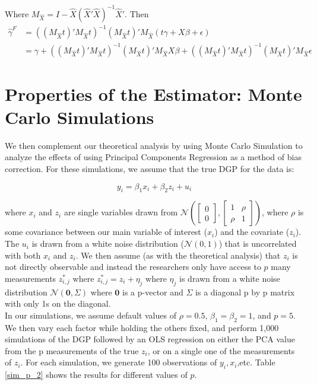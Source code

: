 \documentclass[12pt]{article}
\def\g{\gamma}
\begin{document}
Where $M_{\hat{X}}=I-\hat{X}(\hat{X}'\hat{X})^{-1}\hat{X}'$. Then
\begin{align}
     \hat{\g}^F & = ((M_{\hat{X}}t)'M_{\hat{X}}t)^{-1}(M_{\hat{X}}t)'M_{\hat{X}}(t\gamma  + X\beta + \epsilon) \\
     &=\gamma +((M_{\hat{X}}t)'M_{\hat{X}}t)^{-1}(M_{\hat{X}}t)'M_{\hat{X}}X\beta+((M_{\hat{X}}t)'M_{\hat{X}}t)^{-1}(M_{\hat{X}}t)'M_{\hat{X}}\epsilon
\end{align}

    \section*{Properties of the Estimator: Monte Carlo Simulations}

        We then complement our theoretical analysis by using Monte Carlo Simulation to analyze the effects of using Principal Components Regression as a method of bias correction. For these simulations, we assume that the true DGP for the data is:

        $$y_i = \beta_1 x_i + \beta_2 z_i + u_i$$

        where $x_i$ and $z_i$ are single variables drawn from $\mathcal{N}(\begin{bmatrix} 0\\ 0 \end{bmatrix}, \begin{bmatrix} 1 & \rho\\ \rho & 1\end{bmatrix})$, where $\rho$ is some covariance between our main variable of interest ($x_i$) and the covariate ($z_i$). The $u_i$ is drawn from a white noise distribution ($\mathcal{N}(0,1)$) that is uncorrelated with both $x_i$ and $z_i$. We then assume (as with the theoretical analysis) that $z_i$ is not directly observable and instead the researchers only have access to $p$ many measurements $z_{i,j}^*$ where $z_{i,j}^* = z_i + \eta_j$ where $\eta_j$ is drawn from a white noise distribution $\mathcal{N}(\mathbf{0},\Sigma)$ where $\mathbf{0}$ is a p-vector and $\Sigma$ is a diagonal p by p matrix with only 1s on the diagonal.\\
        
        In our simulations, we assume default values of $\rho = 0.5$, $\beta_1 = \beta_2 = 1$, and $p=5$. We then vary each factor while holding the others fixed, and perform 1,000 simulations of the DGP followed by an OLS regression on either the PCA value from the p measurements of the true $z_i$, or on a single one of the measurements of $z_i$. For each simulation, we generate 100 observations of $y_i,x_i$,etc. Table \ref{sim_p_2} shows the results for different values of $p$.
\end{document}
